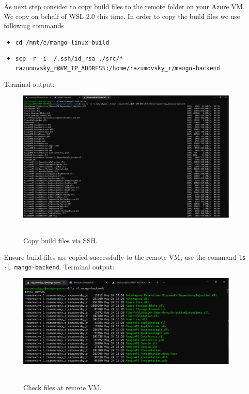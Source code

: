 As next step consider to copy build files to the remote folder on your Azure VM\@.
We copy on behalf of WSL 2.0 this time.
In order to copy the build files we use following commands
\begin{itemize}
    \item \texttt{cd /mnt/e/mango-linux-build}
    \item \texttt{scp -r -i ~/.ssh/id\_rsa ./src/* \\ razumovsky\_r@VM\_IP\_ADDRESS:/home/razumovsky\_r/mango-backend}
\end{itemize}
Terminal output:
\begin{figure}[H]
    \centering
    \includegraphics[width=1\textwidth]{img/04_copy_build_files_via_ssh}
    ~\caption{Copy build files via SSH.}\label{fig:figure11}
\end{figure}
Ensure build files are copied successfully to the remote VM, use the command \texttt{ls -l mango-backend}.
Terminal output:
\begin{figure}[H]
    \centering
    \includegraphics[width=1\textwidth]{img/04_verify_files_on_remote_vm}
    ~\caption{Check files at remote VM.}\label{fig:figure12}
\end{figure}


